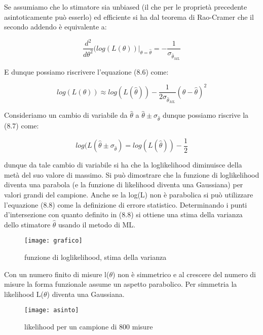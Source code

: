 \documentclass[11pt,a4paper]{book}
\begin{document}
\noindent Se assumiamo che lo stimatore sia unbiased (il che per le propriet\`{a} precedente asintoticamente pu\`{o} esserlo) ed efficiente si ha dal teorema di Rao-Cramer che il secondo addendo \`{e} equivalente a:

\begin{equation*}
		\frac{d^2}{d\theta^2}(log(L(\theta))\vert_{\theta = \hat{\theta}} = - \frac{1}{\sigma_{\hat{\theta}_{ML}}}
\end{equation*}

\noindent E dunque possiamo riscrivere l'equazione (8.6) come:


\begin{equation}
	log(L(\theta)) \approx log(L(\hat{\theta})) -\frac{1}{2\sigma_{\hat{\theta}_{ML}}} (\theta - \hat{\theta})^2
\end{equation}

\noindent Consideriamo un cambio di variabile da $\hat{\theta}$ a $\hat{\theta}\pm \sigma_{\hat{\theta}}$ dunque possiamo riscrive la (8.7) come:

\begin{equation}
	log(L(\hat{\theta}\pm \sigma_{\hat{\theta}}) = log(L(\hat{\theta})) - \frac{1}{2}
\end{equation}

\noindent dunque da tale cambio di variabile si ha che la loglikelihood diminuisce della met\`{a} del suo valore di massimo. Si pu\`{o} dimostrare che la funzione di loglikelihood diventa una parabola (e la funzione di likelihood diventa una Gaussiana) per valori grandi del campione. Anche se la log(L) non \`{e} parabolica si pu\`{o} utilizzare l'equazione (8.8) come la definizione di errore statistico. Determinando i punti d'intersezione con quanto definito in (8.8) si ottiene una stima della varianza dello stimatore $\hat{\theta}$ usando il metodo di ML.

 
\begin{figure}[!ht]
\vspace{0.2in}
\texttt{[image: grafico]}	
\centering
\vspace{0.2in}
\caption{funzione di loglikelihood, stima della varianza}
\end{figure}

\noindent Con un numero finito di misure l($\theta$) non \`{e} simmetrico e al crescere del numero di misure la forma funzionale assume un aspetto parabolico. Per simmetria la likelihood L($\theta$) diventa una Gaussiana.

 
\begin{figure}[!ht]
\texttt{[image: asinto]}	
\centering
\caption{likelihood per un campione di 800 misure}
\end{figure}
\end{document}
